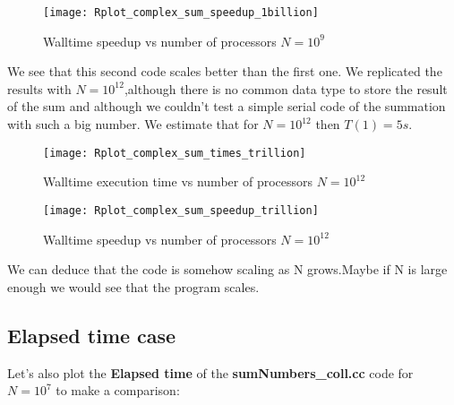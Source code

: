 \documentclass[11pt]{scrartcl} %
\begin{document}
\begin{figure}[H] %
	\centering
	\texttt{[image: Rplot\_complex\_sum\_speedup\_1billion]} %
	\caption{Walltime speedup vs number of processors $N= 10^9$}
\end{figure}
We see that this second code scales better than the first one.
We replicated the results with $N=10^{12}$,although there is no common data type to store the result of the sum and although we couldn't test a simple serial code of the summation with such a big number. We estimate that for $N=10^{12}$ then $T(1) = 5 s$.
\begin{figure}[H] %
	\centering
	\texttt{[image: Rplot\_complex\_sum\_times\_trillion]} %
	\caption{Walltime execution time vs number of processors $N= 10^{12}$}
\end{figure}
\begin{figure}[H] %
	\centering
	\texttt{[image: Rplot\_complex\_sum\_speedup\_trillion]} %
	\caption{Walltime speedup vs number of processors $N= 10^{12}$}
\end{figure}
We can deduce that the code is somehow scaling as N grows.Maybe if N is large enough we would see that the program scales.
\subsection{\textbf{Elapsed time} case}
Let's also plot the \textbf{Elapsed time} of the \textbf{sumNumbers\_coll.cc} code for $N=10^7$ to make a comparison:
\end{document}
